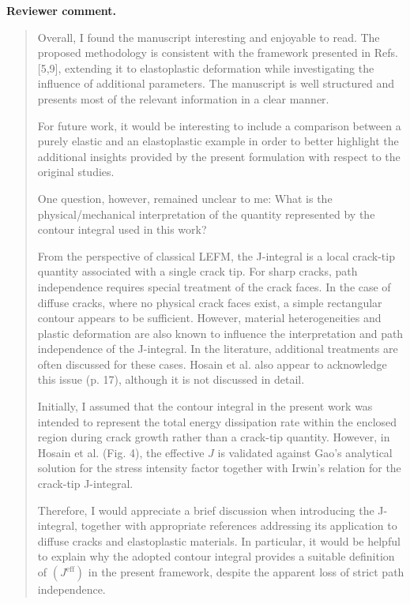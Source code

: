 \documentclass[a4paper,11pt]{article}
\newenvironment{ReviewerComment}{\begin{quote}\small}{\end{quote}}
\begin{document}
\textbf{Reviewer comment.}
\begin{ReviewerComment}
Overall, I found the manuscript interesting and enjoyable to read.
The proposed methodology is consistent with the framework presented
in Refs. [5,9], extending it to elastoplastic deformation while
investigating the influence of additional parameters. The manuscript
is well structured and presents most of the relevant information in a
clear manner.

For future work, it would be interesting to include a comparison
between a purely elastic and an elastoplastic example in order to
better highlight the additional insights provided by the present
formulation with respect to the original studies.

One question, however, remained unclear to me: What is the
physical/mechanical interpretation of the quantity represented by the
contour integral used in this work?

From the perspective of classical LEFM, the J-integral is a local
crack-tip quantity associated with a single crack tip. For sharp
cracks, path independence requires special treatment of the crack
faces. In the case of diffuse cracks, where no physical crack faces
exist, a simple rectangular contour appears to be sufficient.
However, material heterogeneities and plastic deformation are also
known to influence the interpretation and path independence of the
J-integral. In the literature, additional treatments are often
discussed for these cases. Hosain et al. also appear to acknowledge
this issue (p. 17), although it is not discussed in detail.

Initially, I assumed that the contour integral in the present work
was intended to represent the total energy dissipation rate within
the enclosed region during crack growth rather than a crack-tip
quantity. However, in Hosain et al. (Fig. 4), the effective \(J\) is
validated against Gao's analytical solution for the stress intensity
factor together with Irwin's relation for the crack-tip J-integral.

Therefore, I would appreciate a brief discussion when introducing the
J-integral, together with appropriate references addressing its
application to diffuse cracks and elastoplastic materials. In
particular, it would be helpful to explain why the adopted contour
integral provides a suitable definition of \((J^{\mathrm{eff}})\) in
the present framework, despite the apparent loss of strict path
independence.
\end{ReviewerComment}
\end{document}
